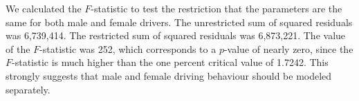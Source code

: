 



We calculated the $F$-statistic to test the restriction 
that the parameters are the same for both male and female drivers. 
The unrestricted sum of squared residuals was 6,739,414. 
The restricted sum of squared residuals was 6,873,221. 
The value of the $F$-statistic was 252, 
which corresponds to a $p$-value of nearly zero, since the $F$-statistic is much higher than 
 the one percent critical value of 1.7242. 
This strongly suggests that male and female driving behaviour should be modeled separately. 
